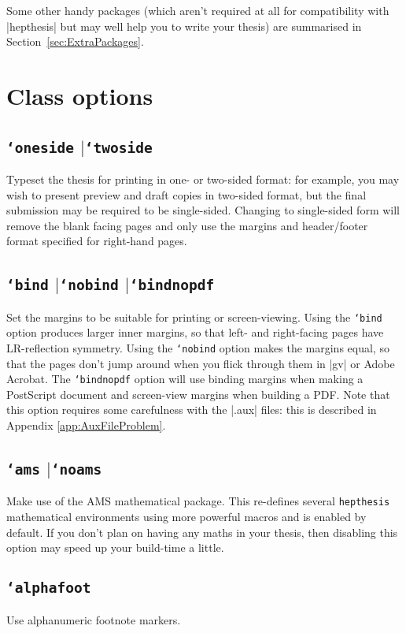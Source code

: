 \documentclass[12pt]{article}
\newcommand{\hepthesis}{\texttt{hepthesis}\xspace}
\newcommand{\Or}{\ensuremath{\vert}\xspace}
\newcommand{\texopt}[1]{\texttt{\char`#1}}
\newcommand{\texoption}[1]{\texopt{#1}}
\begin{document}
Some other handy packages (which aren't required at all for compatibility with
|hepthesis| but may well help you to write your thesis) are summarised in
Section~\ref{sec:ExtraPackages}.


\section{Class options}
\label{sec:Options}

\subsection{\texoption{oneside} \Or \texoption{twoside}}
Typeset the thesis for printing in one- or two-sided format: for example, you
may wish to present preview and draft copies in two-sided format, but the final
submission may be required to be single-sided. Changing to single-sided form
will remove the blank facing pages and only use the margins and header/footer
format specified for right-hand pages.

\subsection{\texoption{bind} \Or \texoption{nobind} \Or \texoption{bindnopdf}}
Set the margins to be suitable for printing or screen-viewing. Using the
\texoption{bind} option produces larger inner margins, so that left- and
right-facing pages have LR-reflection symmetry. Using the \texoption{nobind}
option makes the margins equal, so that the pages don't jump around when you
flick through them in |gv| or Adobe Acrobat. The \texoption{bindnopdf} option
will use binding margins when making a PostScript document and screen-view
margins when building a PDF. Note that this option requires some carefulness
with the |.aux| files: this is described in Appendix \ref{app:AuxFileProblem}.

\subsection{\texoption{ams} \Or \texoption{noams}}
Make use of the AMS mathematical package. This re-defines several \hepthesis
mathematical environments using more powerful macros and is enabled by default.
If you don't plan on having any maths in your thesis, then disabling this option
may speed up your build-time a little.

\subsection{\texoption{alphafoot}}
Use alphanumeric footnote markers.
\end{document}
